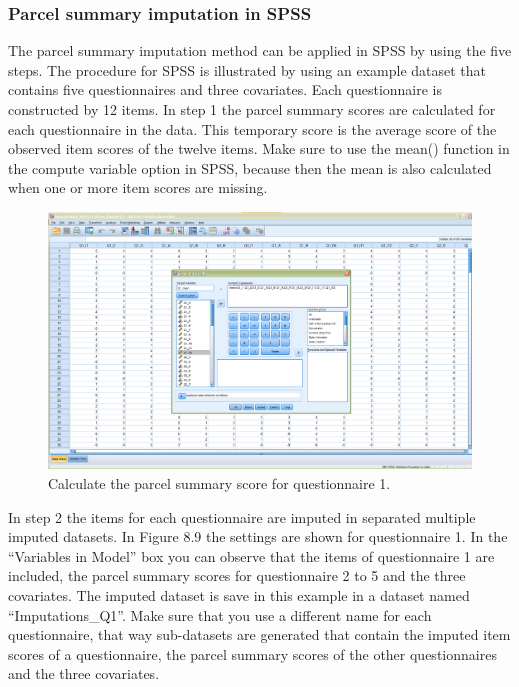 \documentclass[]{book}
\begin{document}
\subsubsection{Parcel summary imputation in
SPSS}\label{parcel-summary-imputation-in-spss}

The parcel summary imputation method can be applied in SPSS by using the
five steps. The procedure for SPSS is illustrated by using an example
dataset that contains five questionnaires and three covariates. Each
questionnaire is constructed by 12 items. In step 1 the parcel summary
scores are calculated for each questionnaire in the data. This temporary
score is the average score of the observed item scores of the twelve
items. Make sure to use the mean() function in the compute variable
option in SPSS, because then the mean is also calculated when one or
more item scores are missing.

\begin{figure}

{\centering \includegraphics[width=0.9\linewidth]{images/fig8.7} 

}

\caption{Calculate the parcel summary score for questionnaire 1.}\label{fig:fig8-7}
\end{figure}

In step 2 the items for each questionnaire are imputed in separated
multiple imputed datasets. In Figure 8.9 the settings are shown for
questionnaire 1. In the ``Variables in Model'' box you can observe that
the items of questionnaire 1 are included, the parcel summary scores for
questionnaire 2 to 5 and the three covariates. The imputed dataset is
save in this example in a dataset named ``Imputations\_Q1''. Make sure
that you use a different name for each questionnaire, that way
sub-datasets are generated that contain the imputed item scores of a
questionnaire, the parcel summary scores of the other questionnaires and
the three covariates.
\end{document}
